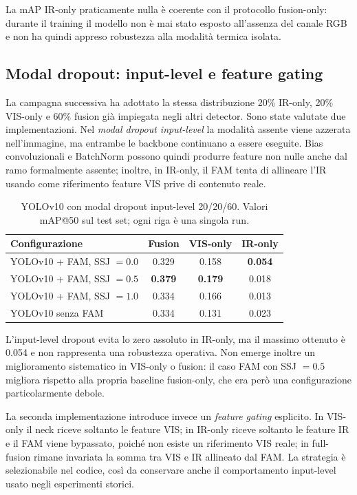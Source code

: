 \documentclass[a4paper,11pt]{article}
\begin{document}
La mAP IR-only praticamente nulla è coerente con il protocollo fusion-only: durante il training il modello non è mai stato esposto all'assenza del canale RGB e non ha quindi appreso robustezza alla modalità termica isolata.

\subsection{Modal dropout: input-level e feature gating}

La campagna successiva ha adottato la stessa distribuzione 20\% IR-only, 20\% VIS-only e 60\% fusion già impiegata negli altri detector. Sono state valutate due implementazioni. Nel \emph{modal dropout input-level} la modalità assente viene azzerata nell'immagine, ma entrambe le backbone continuano a essere eseguite. Bias convoluzionali e BatchNorm possono quindi produrre feature non nulle anche dal ramo formalmente assente; inoltre, in IR-only, il FAM tenta di allineare l'IR usando come riferimento feature VIS prive di contenuto reale.

\begin{table}[H]
\centering
\caption{YOLOv10 con modal dropout input-level 20/20/60. Valori mAP@50 sul test set; ogni riga è una singola run.}
\label{tab:yolo_md_input}
\begin{tabular}{lccc}
\toprule
Configurazione & Fusion & VIS-only & IR-only \\
\midrule
YOLOv10 + FAM, SSJ $=0.0$ & 0.329 & 0.158 & \textbf{0.054} \\
YOLOv10 + FAM, SSJ $=0.5$ & \textbf{0.379} & \textbf{0.179} & 0.018 \\
YOLOv10 + FAM, SSJ $=1.0$ & 0.334 & 0.166 & 0.013 \\
YOLOv10 senza FAM & 0.334 & 0.131 & 0.023 \\
\bottomrule
\end{tabular}
\end{table}

L'input-level dropout evita lo zero assoluto in IR-only, ma il massimo ottenuto è 0.054 e non rappresenta una robustezza operativa. Non emerge inoltre un miglioramento sistematico in VIS-only o fusion: il caso FAM con SSJ $=0.5$ migliora rispetto alla propria baseline fusion-only, che era però una configurazione particolarmente debole.

La seconda implementazione introduce invece un \emph{feature gating} esplicito. In VIS-only il neck riceve soltanto le feature VIS; in IR-only riceve soltanto le feature IR e il FAM viene bypassato, poiché non esiste un riferimento VIS reale; in full-fusion rimane invariata la somma tra VIS e IR allineato dal FAM. La strategia è selezionabile nel codice, così da conservare anche il comportamento input-level usato negli esperimenti storici.
\end{document}
